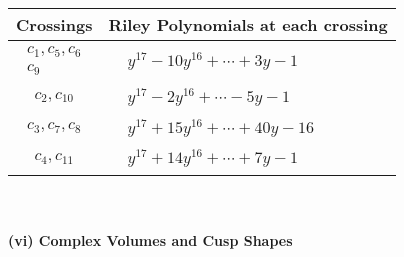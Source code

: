 \documentclass[1p]{elsarticle_modified}
\theoremstyle{definition}
\begin{document}
\begin{tabular}{m{50pt}|m{274pt}}
Crossings & \hspace{64pt}Riley Polynomials at each crossing \\
\hline $$\begin{aligned}c_{1},c_{5},c_{6}\\c_{9}\end{aligned}$$&$\begin{aligned}
&y^{17}-10 y^{16}+\cdots+3 y-1
\end{aligned}$\\
\hline $$\begin{aligned}c_{2},c_{10}\end{aligned}$$&$\begin{aligned}
&y^{17}-2 y^{16}+\cdots-5 y-1
\end{aligned}$\\
\hline $$\begin{aligned}c_{3},c_{7},c_{8}\end{aligned}$$&$\begin{aligned}
&y^{17}+15 y^{16}+\cdots+40 y-16
\end{aligned}$\\
\hline $$\begin{aligned}c_{4},c_{11}\end{aligned}$$&$\begin{aligned}
&y^{17}+14 y^{16}+\cdots+7 y-1
\end{aligned}$\\
\hline
\end{tabular}\\~\\
\newpage\flushleft \textbf{(vi) Complex Volumes and Cusp Shapes}
\end{document}

